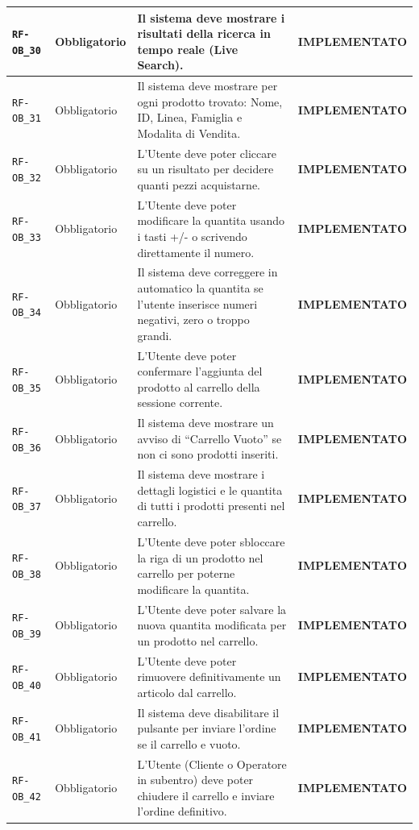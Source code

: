 \documentclass[a4paper, 11pt, oneside]{scrartcl}
\begin{document}
\begin{longtable}{|>{\raggedright\arraybackslash}p{}|>{\raggedright\arraybackslash}p{}|>{\raggedright\arraybackslash}p{}|>{\raggedright\arraybackslash}p{}|}
    \hline
    \texttt{RF-OB\_30} & Obbligatorio & Il sistema deve mostrare i risultati della ricerca in tempo reale (Live Search). & \textbf{IMPLEMENTATO} \\
    \hline
    \texttt{RF-OB\_31} & Obbligatorio & Il sistema deve mostrare per ogni prodotto trovato: Nome, ID, Linea, Famiglia e Modalita di Vendita. & \textbf{IMPLEMENTATO} \\
    \hline
    \texttt{RF-OB\_32} & Obbligatorio & L'Utente deve poter cliccare su un risultato per decidere quanti pezzi acquistarne. & \textbf{IMPLEMENTATO} \\
    \hline
    \texttt{RF-OB\_33} & Obbligatorio & L'Utente deve poter modificare la quantita usando i tasti +/- o scrivendo direttamente il numero. & \textbf{IMPLEMENTATO} \\
    \hline
    \texttt{RF-OB\_34} & Obbligatorio & Il sistema deve correggere in automatico la quantita se l'utente inserisce numeri negativi, zero o troppo grandi. & \textbf{IMPLEMENTATO} \\
    \hline
    \texttt{RF-OB\_35} & Obbligatorio & L'Utente deve poter confermare l'aggiunta del prodotto al carrello della sessione corrente. & \textbf{IMPLEMENTATO} \\
    \hline
    \texttt{RF-OB\_36} & Obbligatorio & Il sistema deve mostrare un avviso di ``Carrello Vuoto'' se non ci sono prodotti inseriti. & \textbf{IMPLEMENTATO} \\
    \hline
    \texttt{RF-OB\_37} & Obbligatorio & Il sistema deve mostrare i dettagli logistici e le quantita di tutti i prodotti presenti nel carrello. & \textbf{IMPLEMENTATO} \\
    \hline
    \texttt{RF-OB\_38} & Obbligatorio & L'Utente deve poter sbloccare la riga di un prodotto nel carrello per poterne modificare la quantita. & \textbf{IMPLEMENTATO} \\
    \hline
    \texttt{RF-OB\_39} & Obbligatorio & L'Utente deve poter salvare la nuova quantita modificata per un prodotto nel carrello. & \textbf{IMPLEMENTATO} \\
    \hline
    \texttt{RF-OB\_40} & Obbligatorio & L'Utente deve poter rimuovere definitivamente un articolo dal carrello. & \textbf{IMPLEMENTATO} \\
    \hline
    \texttt{RF-OB\_41} & Obbligatorio & Il sistema deve disabilitare il pulsante per inviare l'ordine se il carrello e vuoto. & \textbf{IMPLEMENTATO} \\
    \hline
    \texttt{RF-OB\_42} & Obbligatorio & L'Utente (Cliente o Operatore in subentro) deve poter chiudere il carrello e inviare l'ordine definitivo. & \textbf{IMPLEMENTATO} \\

\end{longtable}
\end{document}
